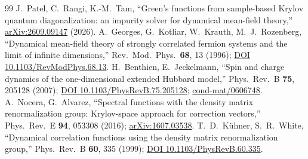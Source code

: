 \begin{thebibliography}{99}
%
%
 J.~Patel, C.~Rangi, K.-M.~Tam, ``Green's functions from sample-based Krylov quantum diagonalization: an impurity solver for dynamical mean-field theory,'' \href{https://arxiv.org/abs/2609.09147}{arXiv:2609.09147} (2026).
 A.~Georges, G.~Kotliar, W.~Krauth, M.~J.~Rozenberg, ``Dynamical mean-field theory of strongly correlated fermion systems and the limit of infinite dimensions,'' Rev.\ Mod.\ Phys.\ \textbf{68}, 13 (1996); \href{https://doi.org/10.1103/RevModPhys.68.13}{DOI 10.1103/RevModPhys.68.13}.
 H.~Benthien, E.~Jeckelmann, ``Spin and charge dynamics of the one-dimensional extended Hubbard model,'' Phys.\ Rev.\ B \textbf{75}, 205128 (2007); \href{https://doi.org/10.1103/PhysRevB.75.205128}{DOI 10.1103/PhysRevB.75.205128}; \href{https://arxiv.org/abs/cond-mat/0606748}{cond-mat/0606748}.
 A.~Nocera, G.~Alvarez, ``Spectral functions with the density matrix renormalization group: Krylov-space approach for correction vectors,'' Phys.\ Rev.\ E \textbf{94}, 053308 (2016); \href{https://arxiv.org/abs/1607.03538}{arXiv:1607.03538}.
 T.~D.~K\"uhner, S.~R.~White, ``Dynamical correlation functions using the density matrix renormalization group,'' Phys.\ Rev.\ B \textbf{60}, 335 (1999); \href{https://doi.org/10.1103/PhysRevB.60.335}{DOI 10.1103/PhysRevB.60.335}.

\end{thebibliography}
